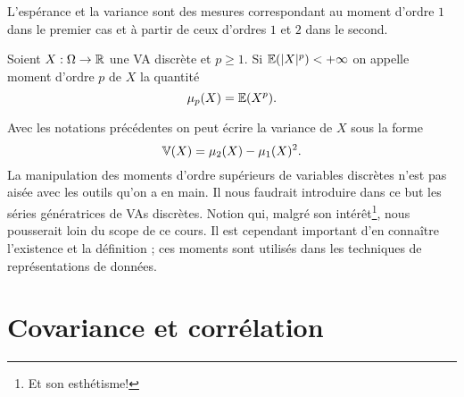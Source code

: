 \documentclass[11pt, a4paper]{article}
\begin{document}
L'espérance et la variance sont des mesures correspondant au moment
d'ordre $1$ dans le premier cas et à partir de ceux d'ordres $1$ et
$2$ dans le second.
\begin{defn}
  Soient $X : \Omega \to \mathbb{R}$ une VA discrète et $p \geq 1$. Si
  $\operatorname{\mathbb{E}}(|X|^p) < +\infty$ on appelle moment d'ordre $p$ de $X$ la
  quantité
  \[
    \mu_p(X) = \operatorname{\mathbb{E}}(X^p).
  \]
\end{defn}
Avec les notations précédentes on peut écrire la variance de $X$ sous
la forme
\[
  \operatorname{\mathbb{V}}(X) = \mu_2(X) - \mu_1(X)^2.
\]
La manipulation des moments d'ordre supérieurs de variables discrètes
n'est pas aisée avec les outils qu'on a en main. Il nous faudrait
introduire dans ce but les séries génératrices de VAs
discrètes. Notion qui, malgré son intérêt\footnote{Et son
  esthétisme!}, nous pousserait loin du scope de ce cours. Il est
cependant important d'en connaître l'existence et la définition ; ces
moments sont utilisés dans les techniques de représentations de
données.

\section{Covariance et corrélation}
\label{sec:convarianceetcorrelation}




\end{document}

